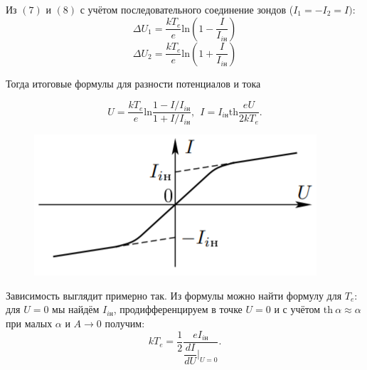 \documentclass[a4paper, 12pt]{article}
\begin{document}
	Из $(7)$ и $(8)$ с учётом последовательного соединение зондов ($I_1 = -I_2 = I)$:
	$$
	\Delta U_1= \dfrac{kT_e}{e}\text{ln}\left(1 - \dfrac{I}{I_{i\text{н}}}\right)
	$$
	$$
	\Delta U_2= \dfrac{kT_e}{e}\text{ln}\left(1 + \dfrac{I}{I_{i\text{н}}}\right)
	$$
	
	Тогда итоговые формулы для разности потенциалов и тока
	
	\begin{equation}
		U = \dfrac{kT_e}{e}\text{ln}\dfrac{1 - I/I_{i\text{н}}}{1 + I/I_{i\text{н}}}, \ \
		I = I_{i\text{н}} \text{th}\dfrac{eU}{2kT_e}.
	\end{equation}
	\newpage
	\begin{figure}
		\includegraphics[scale=0.8]{4.png}
	\end{figure}
	Зависимость выглядит примерно так.
	Из формулы можно найти формулу для $T_e$: для $U=0$ мы найдём $I_{i\text{н}}$, продифференцируем в точке $U=0$ и с учётом $\text{th}~\alpha \approx \alpha$ при малых $\alpha$ и $A\rightarrow 0$ получим:
	\begin{equation}
		kT_e = \dfrac{1}{2}\dfrac{eI_{i\text{н}}}{\dfrac{dI}{dU}|_{U=0}}.
	\end{equation}
\end{document}

